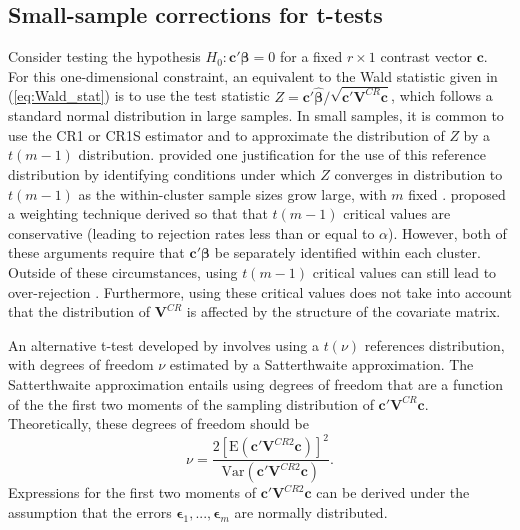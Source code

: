 \documentclass[draft]{ectaart}\usepackage[]{graphicx}\usepackage[]{color}
\newcommand{\E}{\text{E}}
\newcommand{\Var}{\text{Var}}
\newcommand{\bm}{\mathbf}
\newcommand{\bs}{\boldsymbol}
\begin{document}
\subsection{Small-sample corrections for t-tests}
\label{subsec:t-tests}

Consider testing the hypothesis $H_0: \bm{c}'\bs\beta = 0$ for a fixed $r \times 1$ contrast vector $\bm{c}$. 
For this one-dimensional constraint, an equivalent to the Wald statistic given in (\ref{eq:Wald_stat}) is to use the test statistic $Z = \bm{c}'\bs{\hat\beta} / \sqrt{\bm{c}'\bm{V}^{CR}\bm{c}}$, which follows a standard normal distribution in large samples. 
In small samples, it is common to use the CR1 or CR1S estimator and to approximate the distribution of $Z$ by a $t(m - 1)$ distribution. 
\citet{Hansen2007asymptotic} provided one justification for the use of this reference distribution by identifying conditions under which $Z$ converges in distribution to $t(m-1)$ as the within-cluster sample sizes grow large, with $m$ fixed \citep[see also][]{Donald2007inference}. 
\citet{Ibragimov2010tstatistic} proposed a weighting technique derived so that that $t(m-1)$ critical values are conservative (leading to rejection rates less than or equal to $\alpha$).
However, both of these arguments require that $\bm{c}'\bs\beta$ be separately identified within each cluster. 
Outside of these circumstances, using $t(m-1)$ critical values can still lead to over-rejection \citep{Cameron2015practitioners}. 
Furthermore, using these critical values does not take into account that the distribution of $\bm{V}^{CR}$ is affected by the structure of the covariate matrix. 

An alternative t-test developed by \citet{Bell2002bias} involves using a $t(\nu)$ references distribution, with degrees of freedom $\nu$ estimated by a Satterthwaite approximation.
The Satterthwaite approximation \citep{Satterthwaite1946approximate} entails using degrees of freedom that are a function of the the first two moments of the sampling distribution of $\bm{c}' \bm{V}^{CR} \bm{c}$.
Theoretically, these degrees of freedom should be 
\begin{equation}
\label{eq:nu_Satterthwaite}
\nu = \frac{2\left[\E\left(\bm{c}'\bm{V}^{CR2}\bm{c}\right)\right]^2}{\Var\left(\bm{c}'\bm{V}^{CR2}\bm{c}\right)}.
\end{equation}
Expressions for the first two moments of $\bm{c}'\bm{V}^{CR2}\bm{c}$ can be derived under the assumption that the errors $\bs\epsilon_1,...,\bs\epsilon_m$ are normally distributed. 
\end{document}
